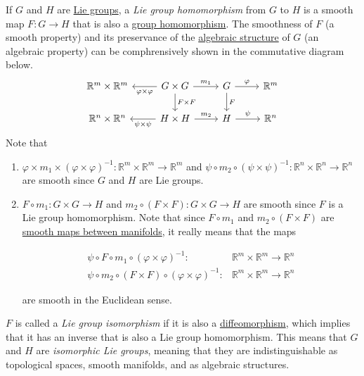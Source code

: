 \documentclass{article}
\newcounter{definition}[section]
\begin{document}
    \begin{definition}
      \label{def:lie-group-homomorphism}
    If $G$ and $H$ are \hyperref[def:lie-group]{Lie groups}, a \textit{Lie group homomorphism} from $G$ to $H$ is a smooth map $F: G \to H$ that is also a \hyperref[alg-def:group-homomorphism]{group homomorphism}. 
    The smoothness of $F$ (a smooth property) and its preservance of the \hyperref[alg-def:algebraic-structure]{algebraic structure} of $G$ (an algebraic property) can be comphrensively shown in the commutative diagram below.
    \begin{equation}
      \begin{tikzcd}
        \mathbb{R}^m \times \mathbb{R}^m & G \times G \arrow{l}{\varphi \times \varphi} \arrow{r}{m_1} \arrow{d}{F \times F} & G \arrow{r}{\varphi} \arrow{d}{F} & \mathbb{R}^m \\
        \mathbb{R}^n \times \mathbb{R}^n & H \times H \arrow{l}{\psi \times \psi} \arrow{r}{m_2} & H \arrow{r}{\psi} & \mathbb{R}^n
      \end{tikzcd}
    \end{equation}
    Note that
    \begin{enumerate}
      \item $\varphi \times m_1 \times (\varphi \times \varphi)^{-1} : \mathbb{R}^m \times \mathbb{R}^m \to \mathbb{R}^m$ and $\psi \circ m_2 \circ (\psi \times \psi)^{-1}: \mathbb{R}^n \times \mathbb{R}^n \to \mathbb{R}^n$ are smooth since $G$ and $H$ are Lie groups. 

      \item $F \circ m_1: G \times G \to H$ and $m_2 \circ (F \times F): G \times G \to H$ are smooth since $F$ is a Lie group homomorphism. Note that since $F \circ m_1$ and $m_2 \circ (F \times F)$ are \hyperref[def:smooth-maps-between-manifolds]{smooth maps between manifolds}, it really means that the maps 

      \begin{align*}
        \psi \circ F \circ m_1 \circ (\varphi \times \varphi)^{-1}: &\mathbb{R}^m \times \mathbb{R}^m \to \mathbb{R}^n \\
        \psi \circ m_2 \circ (F \times F) \circ (\varphi \times \varphi)^{-1}: &\mathbb{R}^m \times \mathbb{R}^m \to \mathbb{R}^n
      \end{align*}

      are smooth in the Euclidean sense. 
    \end{enumerate}

    $F$ is called a \textit{Lie group isomorphism} if it is also a \hyperref[def:diffeomorphism-2]{diffeomorphism}, which implies that it has an inverse that is also a Lie group homomorphism. This means that $G$ and $H$ are \textit{isomorphic Lie groups}, meaning that they are indistinguishable as topological spaces, smooth manifolds, and as algebraic structures. 
    \end{definition}
\end{document}
